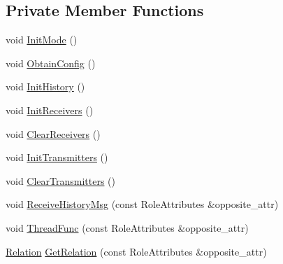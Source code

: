\subsection*{Private Member Functions}
\begin{DoxyCompactItemize}
\item 
void \hyperlink{classapollo_1_1cyber_1_1transport_1_1HybridReceiver_a1eb6243268daf94d62199f2b5d20a4b4}{Init\-Mode} ()
\item 
void \hyperlink{classapollo_1_1cyber_1_1transport_1_1HybridReceiver_a8dad1a54fe3805615e08aeba16392ef6}{Obtain\-Config} ()
\item 
void \hyperlink{classapollo_1_1cyber_1_1transport_1_1HybridReceiver_ac144d497bd484cb2e9882776eb7e0076}{Init\-History} ()
\item 
void \hyperlink{classapollo_1_1cyber_1_1transport_1_1HybridReceiver_a4e2c7f8785a008d9264582b16d19c61e}{Init\-Receivers} ()
\item 
void \hyperlink{classapollo_1_1cyber_1_1transport_1_1HybridReceiver_a8952919c3a6b3b0bf7b7b8b0f0d79f5a}{Clear\-Receivers} ()
\item 
void \hyperlink{classapollo_1_1cyber_1_1transport_1_1HybridReceiver_acadee13b8b6a22395f46b21fe7549614}{Init\-Transmitters} ()
\item 
void \hyperlink{classapollo_1_1cyber_1_1transport_1_1HybridReceiver_a16139e677ea56e82a51c78bd72587ae8}{Clear\-Transmitters} ()
\item 
void \hyperlink{classapollo_1_1cyber_1_1transport_1_1HybridReceiver_a67017f9439548f98a30c6dcc1f7431f9}{Receive\-History\-Msg} (const Role\-Attributes \&opposite\-\_\-attr)
\item 
void \hyperlink{classapollo_1_1cyber_1_1transport_1_1HybridReceiver_a300e68502aada5c5d92fe47d50b4c153}{Thread\-Func} (const Role\-Attributes \&opposite\-\_\-attr)
\item 
\hyperlink{namespaceapollo_1_1cyber_a688ac951fd0a3965da4acdc34c92e50f}{Relation} \hyperlink{classapollo_1_1cyber_1_1transport_1_1HybridReceiver_ac899b765428d18b737c5bc40b5fdde7d}{Get\-Relation} (const Role\-Attributes \&opposite\-\_\-attr)
\end{DoxyCompactItemize}
